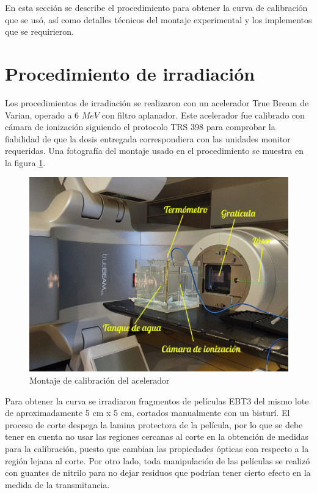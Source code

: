 En esta sección se describe el procedimiento para obtener la curva de calibración que se usó, así como detalles técnicos del montaje experimental y los implementos que se requirieron. 
\section{Procedimiento de irradiación}
Los procedimientos de irradiación se realizaron con un acelerador True Bream de  Varian, operado a 6 $ MeV$ con filtro aplanador. Este acelerador fue calibrado con cámara de ionización siguiendo el protocolo TRS 398 para comprobar la fiabilidad de que la dosis entregada correspondiera con las unidades monitor requeridas. Una fotografía del montaje usado en el procedimiento se muestra en la figura \ref{fig:fotoMontaje}.\\

\begin{figure}
	\centering
	\includegraphics[width=0.7\linewidth]{images/TRS398Editado2.jpg}
	\caption{Montaje de calibración del acelerador}
	\label{fig:fotoMontaje}
\end{figure}
Para obtener la curva se irradiaron fragmentos de películas EBT3 del mismo lote de aproximadamente 5 cm x 5 cm, cortados manualmente con un bisturí. El proceso de corte despega la lamina protectora de la película, por lo que se debe tener en cuenta no usar las regiones cercanas al corte en la obtención de medidas para la calibración, puesto que cambian las propiedades ópticas con respecto a la región lejana al corte. Por otro lado, toda manipulación de las películas se realizó con guantes de nitrilo para no dejar residuos que podrían tener cierto efecto en la medida de la transmitancia. \\

